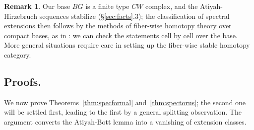\documentclass[11pt, reqno]{amsart}
\theoremstyle{plain}
\theoremstyle{definition}
\newtheorem{rem}[thm]{Remark}
\begin{document}
\begin{rem}
Our base $BG$ is a finite type $CW$ complex, and the Atiyah-Hirzebruch sequences stabilize 
(\S\ref{sec:facts}.3); the classification of spectral extensions then follows by the methods 
of fiber-wise homotopy theory over compact bases, as in \cite{crabbjames}: we can check the 
statements cell by cell over the base. More general situations require care in setting up the 
fiber-wise stable homotopy category. 
\end{rem}

\subsection{Proofs.} We now prove Theorems~\ref{thm:specformal} and~\ref{thm:spectorus}; the second one  
will be settled first, leading to the first by a general splitting observation. The argument converts the 
Atiyah-Bott lemma into a vanishing of extension classes.
\end{document}
